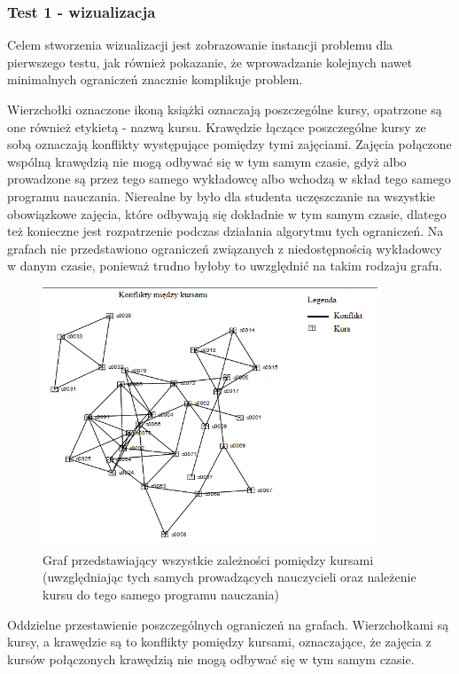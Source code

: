 \subsubsection{Test 1 - wizualizacja}
\par Celem stworzenia wizualizacji jest zobrazowanie instancji problemu dla pierwszego testu, jak również pokazanie, że wprowadzanie kolejnych nawet minimalnych ograniczeń znacznie komplikuje problem.
\par Wierzchołki oznaczone ikoną książki oznaczają poszczególne kursy, opatrzone są one również etykietą - nazwą kursu. Krawędzie łączące poszczególne kursy ze sobą oznaczają konflikty występujące pomiędzy tymi zajęciami. Zajęcia połączone wspólną krawędzią nie mogą odbywać się w tym samym czasie, gdyż albo prowadzone są przez tego samego wykładowcę albo wchodzą w skład tego samego programu nauczania. Nierealne by było dla studenta uczęszczanie na wszystkie obowiązkowe zajęcia, które odbywają się dokładnie w tym samym czasie, dlatego też konieczne jest rozpatrzenie podczas działania algorytmu tych ograniczeń. Na grafach nie przedstawiono ograniczeń związanych z niedostępnością wykładowcy w danym czasie, ponieważ trudno byłoby to uwzględnić na takim rodzaju grafu.
\begin{figure}[H]
  \centering
    \includegraphics[width=10cm]{test1.PNG}
      \caption{Graf przedstawiający wszystkie zależności pomiędzy kursami (uwzględniając tych samych prowadzących nauczycieli oraz należenie kursu do tego samego programu nauczania) }
\end{figure}
Oddzielne przestawienie poszczególnych ograniczeń na grafach. Wierzchołkami są kursy, a krawędzie są to konflikty pomiędzy kursami, oznaczające, że zajęcia z kursów połączonych krawędzią nie mogą odbywać się w tym samym czasie.

